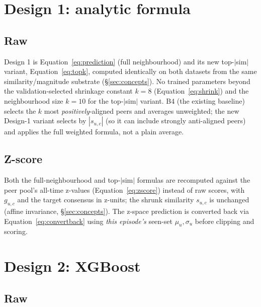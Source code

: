 \documentclass[11pt]{article}
\begin{document}
\section{Design 1: analytic formula}
\label{sec:design1}

\subsection{Raw}

Design 1 is Equation~\ref{eq:prediction} (full neighbourhood) and its new top-$|$sim$|$ variant, Equation~\ref{eq:topk}, computed identically on both datasets from the same similarity/magnitude substrate (\S\ref{sec:concepts}). No trained parameters beyond the validation-selected shrinkage constant $k=8$ (Equation~\ref{eq:shrink}) and the neighbourhood size $k=10$ for the top-$|$sim$|$ variant. B4 (the existing baseline) selects the $k$ most \emph{positively}-aligned peers and averages unweighted; the new Design-1 variant selects by $|s_{u,c}|$ (so it can include strongly anti-aligned peers) and applies the full weighted formula, not a plain average.

\subsection{Z-score}

Both the full-neighbourhood and top-$|$sim$|$ formulas are recomputed against the peer pool's all-time z-values (Equation~\ref{eq:zscore}) instead of raw scores, with $g_{u,c}$ and the target consensus in z-units; the shrunk similarity $s_{u,c}$ is unchanged (affine invariance, \S\ref{sec:concepts}). The z-space prediction is converted back via Equation~\ref{eq:convertback} using \emph{this episode's} seen-set $\mu_u,\sigma_u$ before clipping and scoring.

\section{Design 2: XGBoost}
\label{sec:design2}

\subsection{Raw}
\end{document}

